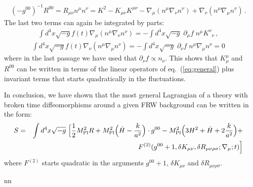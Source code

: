 \documentclass[12pt,letterpaper]{article}
\begin{document}
{\begin{eqnarray}
(-g^{00})^{-1} R^{00}=R_{\mu\nu}n^\mu n^\nu = K^2 -K_{\mu\nu}K^{\mu\nu}-\nabla_\mu(n^\mu\nabla_\nu n^\nu)+\nabla_\nu(n^\mu \nabla_\mu n^\nu)\, .
\end{eqnarray}
The last two terms can again be integrated by parts:
\begin{eqnarray}
\int d^4x \sqrt{-g} f(t) \nabla_\mu(n^\mu\nabla_\nu n^\nu)=-\int d^4x \sqrt{-g}\; \partial_\mu f\; n^\mu K^\nu {}_\nu\, ,
\end{eqnarray}
\begin{eqnarray}
\int d^4 x \sqrt{-g} f(t) \nabla_\nu(n^\mu \nabla_\mu n^\nu)=-\int d^4 x \sqrt{-g}\; \partial_\nu f\; n^\mu\nabla_\mu n^\nu =0
\end{eqnarray}
where in the last passage we have used that $\partial_\nu f \propto n_\nu$. This shows that $K^\mu_\mu$ and $R^{00}$ can be written in terms of the linear operators of eq.~(\ref{eq:general}) plus invariant terms that
starts quadratically in the fluctuations.

In conclusion, we have shown that the most general Lagrangian of a theory with broken time diffeomorphisms around a given FRW  background can be written in the form:
\begin{eqnarray}
S &=& \int d^4x \sqrt{-g} \; \Big[\frac12 M_{\rm Pl}^2 R + M_{\rm Pl}^2 \Big(\dot H-\frac{k}{a^2}\Big) \cdot g^{00} - M_{\rm Pl}^2 \Big(3 H^2 +\dot H+2\frac{k}{a^2}\Big) +  \\ \nonumber &&  F^{(2)}(g^{00}+1,\delta K_{\mu\nu}, \delta R_{\mu\nu\rho\sigma};\nabla_\mu;t)\Big]
\label{eq:general2}
\end{eqnarray}
where $F^{(2)}$ starts quadratic in the arguments $g^{00}+1$, $\delta K_{\mu\nu}$ and $\delta R_{\mu\nu\rho\sigma}$.
     
     

%







\footnotesize
\parskip 0pt

\begin{thebibliography}{nn}



\end{thebibliography}}
\end{document}
